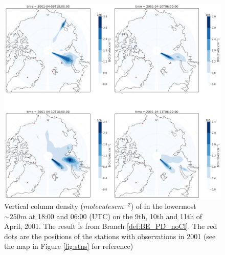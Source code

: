 \begin{figure}[h]
    \centering
    \includegraphics[width = \linewidth]{Chapter6_Results/images/Polar_StationComp_2001/BrO/polarBrO_noCl.png}
    \caption{Vertical column density ($molecules cm^{-2}$) of  in the lowermost $\sim 250 m$ at 18:00 and 06:00 (UTC) on the 9th, 10th and 11th of April, 2001. The result is from Branch \ref{def:BE_PD_noCl}. The red dots are the positions of the stations with observations in 2001 (see the map in Figure \ref{fig:stns} for reference)}
    \label{fig:polarBrO_noCl}
\end{figure}